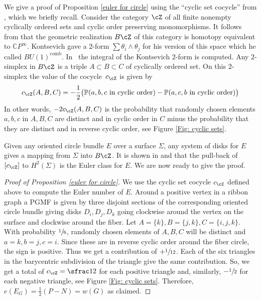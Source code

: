 \documentclass[JEP,XML,SOM,Unicode,NoFloatCountersInSection]{cedram}
\theoremstyle{plain}
\theoremstyle{definition}
\begin{document}
We give a proof of Proposition \ref{euler for circle} using the ``cyclic set cocycle'' from \cite{I04}, which we briefly recall. Consider the category $\cZ$ of all finite nonempty cyclically ordered sets and cyclic order preserving monomorphisms. It follows from \cite{K92} that the geometric realization $B\cZ$ of this category is homotopy equivalent to $\mathbb CP^\infty$. Kontsevich gave a $2$-form $\sum \theta_i\wedge \theta_j$ for his version of this space which he called $BU(1)^\mathrm{comb}$. In~\cite{I04} the integral of the Kontsevich $2$-form is computed. Any $2$\nobreakdash-simplex in $B\cZ$ is a triple $A\subset B\subset C$ of cyclically ordered set. On this $2$\nobreakdash-simplex the value of the cocycle~$c_\cZ$ is given by
\[
c_\cZ(A,B,C)= -\frac12 \big(\mathbb P(a,b,c\text{ in cyclic order})-\mathbb P(a,c,b\text{ in cyclic order})\big)
\]
In other words, $-2c_\cZ(A,B,C)$ is the probability that randomly chosen elements $a,b,c$ in $A,B,C$ are distinct and in cyclic order in $C$ minus the probability that they are distinct and in reverse cyclic order, see Figure \ref{Fig: cyclic sets}.

Given any oriented circle bundle $E$ over a surface $\Sigma$, any system of disks for $E$ gives a mapping from $\Sigma$ into $B\cZ$. It is shown in \cite{I04} and \cite{J89} that the pull-back of~$[c_\cZ]$ to $ H^2(\Sigma)$ is the Euler class for $E$. We are now ready to give the proof.

\begin{proof}[Proof of Proposition \ref{euler for circle}]
We use the cyclic set cocycle $c_\cZ$ defined above to compute the Euler number of $E$.
Around a positive vertex in a ribbon graph a PGMF is given by three disjoint sections of the corresponding oriented circle bundle giving disks $D_i,D_j,D_k$ going clockwise around the vertex on the surface and clockwise around the fiber. Let $A=\{k\}, B=\{j,k\}, C=\{i,j,k\}$. With probability $\sfrac16$, randomly chosen elements of $A,B,C$ will be distinct and $a=k,b=j,c=i$. Since these are in reverse cyclic order around the fiber circle, the sign is positive. Thus we get a contribution of $+\sfrac1{12}$. Each of the six triangles in the barycentric subdivision of the triangle give the same contribution. So, we get a total of $c_\cZ=\sfrac12$ for each positive triangle and, similarly, $-\sfrac12$ for each negative triangle, see Figure \ref{Fig: cyclic sets}. Therefore, $e(E_G)=\frac12(P-N)=w(G)$ as claimed.
\end{proof}
\end{document}
